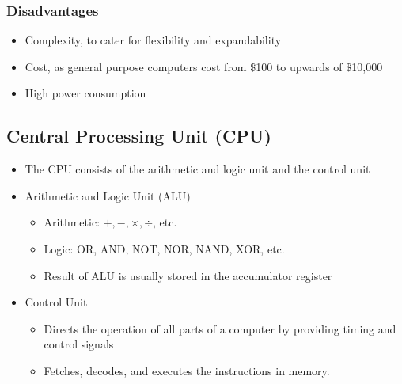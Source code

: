 \documentclass[11pt]{article}
\begin{document}
\subsubsection{Disadvantages}
\label{sec:org087a117}
\begin{itemize}
\item Complexity, to cater for flexibility and expandability
\item Cost, as general purpose computers cost from \$100 to upwards of \(\$\)10,000
\item High power consumption
\end{itemize}

\subsection{Central Processing Unit (CPU)}
\label{sec:org8368abd}
\begin{itemize}
\item The CPU consists of the arithmetic and logic unit and the control unit
\item Arithmetic and Logic Unit (ALU)
\begin{itemize}
\item Arithmetic: \(+, -, \times, \div\), etc.
\item Logic: OR, AND, NOT, NOR, NAND, XOR, etc.
\item Result of ALU is usually stored in the accumulator register
\end{itemize}
\item Control Unit
\begin{itemize}
\item Directs the operation of all parts of a computer by providing timing and control signals
\item Fetches, decodes, and executes the instructions in memory.
\end{itemize}
\end{itemize}
\end{document}
